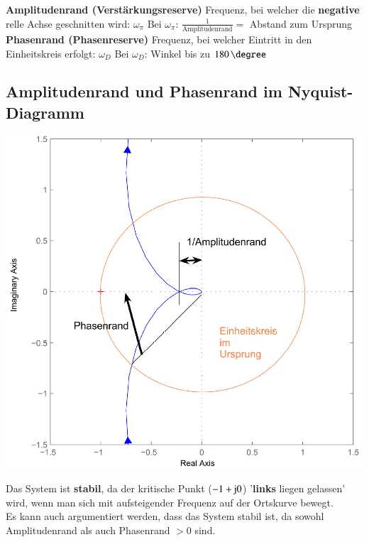 \begin{outline}
    \1 \textbf{Amplitudenrand (Verstärkungsreserve)}
        \2 Frequenz, bei welcher die \textbf{negative} relle Achse geschnitten wird: $\omega_{\pi}$
        \2 Bei $\omega_{\pi}$: $\frac{1}{\text{Amplitudenrand}} =$ Abstand zum Ursprung
    \1 \textbf{Phasenrand (Phasenreserve)}
        \2 Frequenz, bei welcher Eintritt in den Einheitskreis erfolgt: $\omega_D$
        \2 Bei $\omega_D$: Winkel bis zu $180 \, \degree$
\end{outline}


\subsection{Amplitudenrand und Phasenrand im Nyquist-Diagramm}

\begin{minipage}[c]{0.5\columnwidth}
    \includegraphics[width=\columnwidth]{images/nyquist_amplitudenrand_phasenrand.png}
\end{minipage}
\hfill
\begin{minipage}[c]{0.45\columnwidth}
    Das System ist \textbf{stabil}, da der kritische Punkt ($-1 + \mathrm{j} 0$) '\textbf{links} liegen gelassen'
    wird, wenn man sich mit aufsteigender Frequenz auf der Ortskurve bewegt. \\

    Es kann auch argumentiert werden, dass das System stabil ist, da sowohl Amplitudenrand als auch Phasenrand $> 0$ sind.
\end{minipage}
